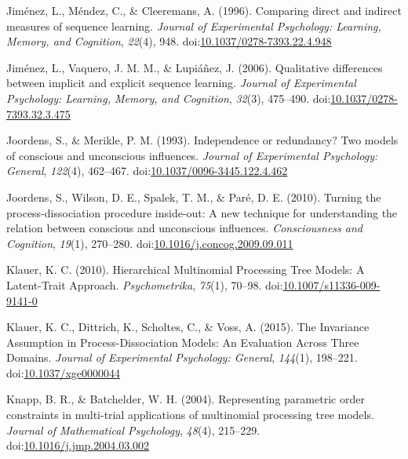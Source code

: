 \documentclass[man]{apa6}
\theoremstyle{definition}
\theoremstyle{definition}
\theoremstyle{definition}
\theoremstyle{remark}
\begin{document}
\hypertarget{ref-jimenez_comparing_1996}{}
Jiménez, L., Méndez, C., \& Cleeremans, A. (1996). Comparing direct and
indirect measures of sequence learning. \emph{Journal of Experimental
Psychology: Learning, Memory, and Cognition}, \emph{22}(4), 948.
doi:\href{https://doi.org/10.1037/0278-7393.22.4.948}{10.1037/0278-7393.22.4.948}

\hypertarget{ref-jimenez_qualitative_2006}{}
Jiménez, L., Vaquero, J. M. M., \& Lupiáñez, J. (2006). Qualitative
differences between implicit and explicit sequence learning.
\emph{Journal of Experimental Psychology: Learning, Memory, and
Cognition}, \emph{32}(3), 475--490.
doi:\href{https://doi.org/10.1037/0278-7393.32.3.475}{10.1037/0278-7393.32.3.475}

\hypertarget{ref-joordens_independence_1993}{}
Joordens, S., \& Merikle, P. M. (1993). Independence or redundancy? Two
models of conscious and unconscious influences. \emph{Journal of
Experimental Psychology: General}, \emph{122}(4), 462--467.
doi:\href{https://doi.org/10.1037/0096-3445.122.4.462}{10.1037/0096-3445.122.4.462}

\hypertarget{ref-joordens_turning_2010}{}
Joordens, S., Wilson, D. E., Spalek, T. M., \& Paré, D. E. (2010).
Turning the process-dissociation procedure inside-out: A new technique
for understanding the relation between conscious and unconscious
influences. \emph{Consciousness and Cognition}, \emph{19}(1), 270--280.
doi:\href{https://doi.org/10.1016/j.concog.2009.09.011}{10.1016/j.concog.2009.09.011}

\hypertarget{ref-klauer_hierarchical_2010}{}
Klauer, K. C. (2010). Hierarchical Multinomial Processing Tree Models: A
Latent-Trait Approach. \emph{Psychometrika}, \emph{75}(1), 70--98.
doi:\href{https://doi.org/10.1007/s11336-009-9141-0}{10.1007/s11336-009-9141-0}

\hypertarget{ref-klauer_invariance_2015}{}
Klauer, K. C., Dittrich, K., Scholtes, C., \& Voss, A. (2015). The
Invariance Assumption in Process-Dissociation Models: An Evaluation
Across Three Domains. \emph{Journal of Experimental Psychology:
General}, \emph{144}(1), 198--221.
doi:\href{https://doi.org/10.1037/xge0000044}{10.1037/xge0000044}

\hypertarget{ref-knapp_representing_2004}{}
Knapp, B. R., \& Batchelder, W. H. (2004). Representing parametric order
constraints in multi-trial applications of multinomial processing tree
models. \emph{Journal of Mathematical Psychology}, \emph{48}(4),
215--229.
doi:\href{https://doi.org/10.1016/j.jmp.2004.03.002}{10.1016/j.jmp.2004.03.002}
\end{document}
